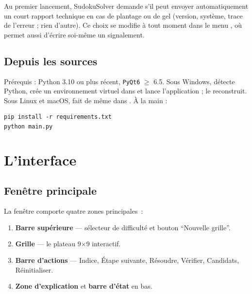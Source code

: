 Au premier lancement, SudokuSolver demande s'il peut envoyer automatiquement
un court rapport technique en cas de plantage ou de gel (version, système,
trace de l'erreur ; rien d'autre). Ce choix se modifie à tout moment dans le
menu , où  permet aussi d'écrire
soi-même un signalement.

\subsection{Depuis les sources}

Prérequis : Python 3.10 ou plus récent, \texttt{PyQt6} $\geq$ 6.5.
Sous Windows,  détecte Python, crée un environnement
virtuel dans 
et lance l'application ;  le reconstruit.
Sous Linux et macOS,  fait de même dans
. À la main :

\begin{lstlisting}
pip install -r requirements.txt
python main.py
\end{lstlisting}

\section{L'interface}

\subsection{Fenêtre principale}

La fenêtre comporte quatre zones principales~:

\begin{enumerate}
  \item \textbf{Barre supérieure} --- sélecteur de difficulté et bouton ``Nouvelle grille''.
  \item \textbf{Grille} --- le plateau 9$\times$9 interactif.
  \item \textbf{Barre d'actions} --- Indice, Étape suivante, Résoudre, Vérifier, Candidats, Réinitialiser.
  \item \textbf{Zone d'explication} et \textbf{barre d'état} en bas.
\end{enumerate}


